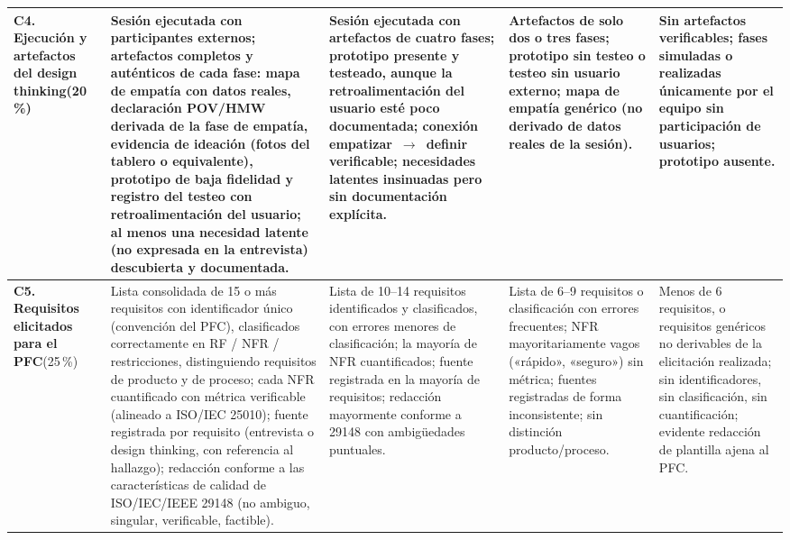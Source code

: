 \documentclass[10pt,a4paper]{article}
\begin{document}
\begin{landscape}
\begin{longtable}{|L{2.9cm}|L{5.0cm}|L{5.0cm}|L{5.0cm}|L{5.0cm}|}
\textbf{C4. Ejecución y artefactos del design thinking}\newline{}(20\,\%) &
Sesión ejecutada con participantes externos; artefactos completos y auténticos de cada fase: mapa de empatía con datos reales, declaración POV/HMW derivada de la fase de empatía, evidencia de ideación (fotos del tablero o equivalente), prototipo de baja fidelidad y registro del testeo con retroalimentación del usuario; al menos una \textbf{necesidad latente} (no expresada en la entrevista) descubierta y documentada. &
Sesión ejecutada con artefactos de cuatro fases; prototipo presente y testeado, aunque la retroalimentación del usuario esté poco documentada; conexión empatizar~$\rightarrow$~definir verificable; necesidades latentes insinuadas pero sin documentación explícita. &
Artefactos de solo dos o tres fases; prototipo sin testeo o testeo sin usuario externo; mapa de empatía genérico (no derivado de datos reales de la sesión). &
Sin artefactos verificables; fases simuladas o realizadas únicamente por el equipo sin participación de usuarios; prototipo ausente.\\
\hline

\textbf{C5. Requisitos elicitados para el PFC}\newline{}(25\,\%) &
Lista consolidada de 15 o más requisitos con identificador único (convención del PFC), clasificados correctamente en RF / NFR / restricciones, distinguiendo requisitos de producto y de proceso; cada NFR cuantificado con métrica verificable (alineado a ISO/IEC 25010); fuente registrada por requisito (entrevista o design thinking, con referencia al hallazgo); redacción conforme a las características de calidad de ISO/IEC/IEEE 29148 (no ambiguo, singular, verificable, factible). &
Lista de 10--14 requisitos identificados y clasificados, con errores menores de clasificación; la mayoría de NFR cuantificados; fuente registrada en la mayoría de requisitos; redacción mayormente conforme a 29148 con ambigüedades puntuales. &
Lista de 6--9 requisitos o clasificación con errores frecuentes; NFR mayoritariamente vagos («rápido», «seguro») sin métrica; fuentes registradas de forma inconsistente; sin distinción producto/proceso. &
Menos de 6 requisitos, o requisitos genéricos no derivables de la elicitación realizada; sin identificadores, sin clasificación, sin cuantificación; evidente redacción de plantilla ajena al PFC.\\
\hline


\end{longtable}
\end{landscape}
\end{document}
